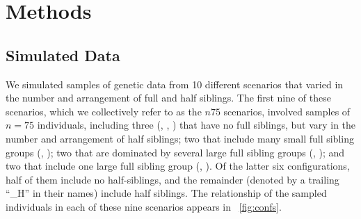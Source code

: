 \section*{Methods}
\subsection*{Simulated Data}
We simulated samples of genetic data from 10 different scenarios that varied in the number and 
arrangement of full and half siblings.  The first nine of these scenarios, which we collectively refer 
to as the $n75$ scenarios, involved samples of $n=75$ individuals, including three (\nosibs{}, 
\allhalf{}, \allpathalf) that have no full siblings, but vary in the number and arrangement of half 
siblings; two that include many small full sibling groups (\sfsnoh{}, \sfswh{}); two that are dominated 
by several large full sibling groups (\slfsgnoh{}, \slfsgwh{}); and two that include one large full 
sibling group (\onelargenoh{}, \onelargewh{}).  Of the latter six configurations, half of them include 
no half-siblings, and the remainder (denoted by a trailing ``\_H'' in their names) include half 
siblings.   The relationship of the sampled individuals in each of these nine scenarios appears in 
\FIG~\ref{fig:confs}.

